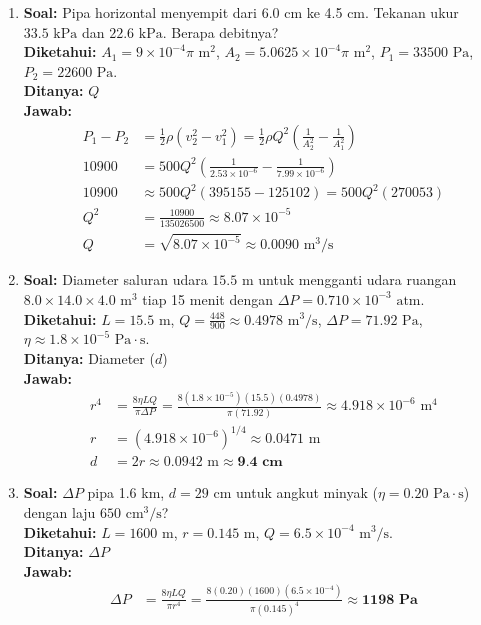 \documentclass[twocolumn]{article}
\begin{document}
\begin{enumerate}
    \item \textbf{Soal:} Pipa horizontal menyempit dari 6.0 cm ke 4.5 cm. Tekanan ukur $33.5 \text{ kPa}$ dan $22.6 \text{ kPa}$. Berapa debitnya? \\
    \textbf{Diketahui:} $A_1 = 9 \times 10^{-4} \pi \text{ m}^2$, $A_2 = 5.0625 \times 10^{-4} \pi \text{ m}^2$, $P_1 = 33500 \text{ Pa}$, $P_2 = 22600 \text{ Pa}$. \\
    \textbf{Ditanya:} $Q$ \\
    \textbf{Jawab:}
    \begin{align*}
        P_1 - P_2 &= \frac{1}{2}\rho \left( v_2^2 - v_1^2 \right) = \frac{1}{2}\rho Q^2 \left( \frac{1}{A_2^2} - \frac{1}{A_1^2} \right) \\
        10900 &= 500 Q^2 \left( \frac{1}{2.53 \times 10^{-6}} - \frac{1}{7.99 \times 10^{-6}} \right) \\
        10900 &\approx 500 Q^2 (395155 - 125102) = 500 Q^2 (270053) \\
        Q^2 &= \frac{10900}{135026500} \approx 8.07 \times 10^{-5} \\
        Q &= \sqrt{8.07 \times 10^{-5}} \approx 0.0090 \text{ m}^3/\text{s}
    \end{align*}

    \item \textbf{Soal:} Diameter saluran udara $15.5 \text{ m}$ untuk mengganti udara ruangan $8.0 \times 14.0 \times 4.0 \text{ m}^3$ tiap 15 menit dengan $\Delta P = 0.710 \times 10^{-3} \text{ atm}$. \\
    \textbf{Diketahui:} $L = 15.5 \text{ m}$, $Q = \frac{448}{900} \approx 0.4978 \text{ m}^3/\text{s}$, $\Delta P = 71.92 \text{ Pa}$, $\eta \approx 1.8 \times 10^{-5} \text{ Pa}\cdot\text{s}$. \\
    \textbf{Ditanya:} Diameter ($d$) \\
    \textbf{Jawab:}
    \begin{align*}
        r^4 &= \frac{8 \eta L Q}{\pi \Delta P} = \frac{8 (1.8 \times 10^{-5}) (15.5) (0.4978)}{\pi (71.92)} \approx 4.918 \times 10^{-6} \text{ m}^4 \\
        r &= (4.918 \times 10^{-6})^{1/4} \approx 0.0471 \text{ m} \\
        d &= 2r \approx 0.0942 \text{ m} \approx \textbf{9.4 cm}
    \end{align*}

    \item \textbf{Soal:} $\Delta P$ pipa 1.6 km, $d = 29 \text{ cm}$ untuk angkut minyak ($\eta = 0.20 \text{ Pa}\cdot\text{s}$) dengan laju $650 \text{ cm}^3/\text{s}$? \\
    \textbf{Diketahui:} $L = 1600 \text{ m}$, $r = 0.145 \text{ m}$, $Q = 6.5 \times 10^{-4} \text{ m}^3/\text{s}$. \\
    \textbf{Ditanya:} $\Delta P$ \\
    \textbf{Jawab:}
    \begin{align*}
        \Delta P &= \frac{8 \eta L Q}{\pi r^4} = \frac{8(0.20)(1600)(6.5 \times 10^{-4})}{\pi (0.145)^4} \approx \textbf{1198 Pa}
    \end{align*}


\end{enumerate}
\end{document}
